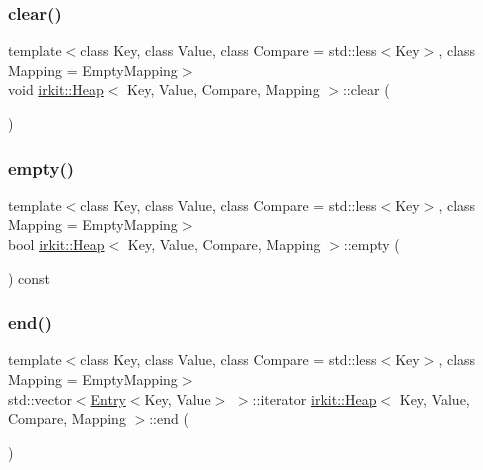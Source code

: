 \mbox{\label{classirkit_1_1Heap_a06373b7aa5262ffc4efe381042e8cb50}} 
\subsubsection{\texorpdfstring{clear()}{clear()}}
{\footnotesize\ttfamily template$<$class Key, class Value, class Compare = std\+::less$<$\+Key$>$, class Mapping = Empty\+Mapping$>$ \\
void \hyperlink{classirkit_1_1Heap}{irkit\+::\+Heap}$<$ Key, Value, Compare, Mapping $>$\+::clear (\begin{DoxyParamCaption}{ }\end{DoxyParamCaption})\hspace{0.3cm}{\ttfamily [inline]}}

\mbox{\label{classirkit_1_1Heap_abb96822afb46391c107efef35e79256b}} 
\subsubsection{\texorpdfstring{empty()}{empty()}}
{\footnotesize\ttfamily template$<$class Key, class Value, class Compare = std\+::less$<$\+Key$>$, class Mapping = Empty\+Mapping$>$ \\
bool \hyperlink{classirkit_1_1Heap}{irkit\+::\+Heap}$<$ Key, Value, Compare, Mapping $>$\+::empty (\begin{DoxyParamCaption}{ }\end{DoxyParamCaption}) const\hspace{0.3cm}{\ttfamily [inline]}}

\mbox{\label{classirkit_1_1Heap_a8451f5ab1ccb727e7964ce94e5ae3b6c}} 
\subsubsection{\texorpdfstring{end()}{end()}}
{\footnotesize\ttfamily template$<$class Key, class Value, class Compare = std\+::less$<$\+Key$>$, class Mapping = Empty\+Mapping$>$ \\
std\+::vector$<$\hyperlink{structirkit_1_1Entry}{Entry}$<$Key, Value$>$ $>$\+::iterator \hyperlink{classirkit_1_1Heap}{irkit\+::\+Heap}$<$ Key, Value, Compare, Mapping $>$\+::end (\begin{DoxyParamCaption}{ }\end{DoxyParamCaption})\hspace{0.3cm}{\ttfamily [inline]}}

